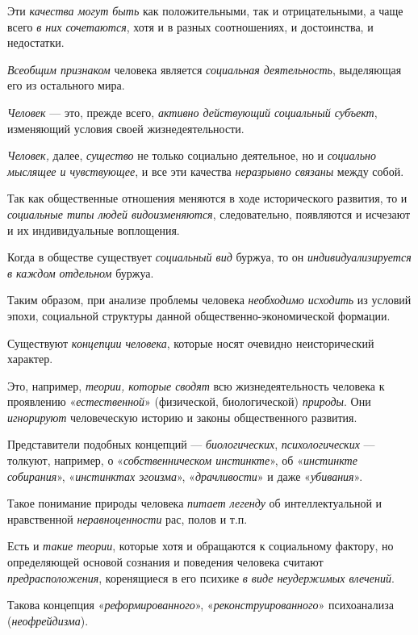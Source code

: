\documentclass[a4paper,14pt,russian]{extreport}
\begin{document}
Эти \emph{качества могут быть} как положительными, так и отрицательными, а чаще всего \emph{в них сочетаются}, хотя и в разных соотношениях, и достоинства, и недостатки.

\emph{Всеобщим признаком} человека является \emph{социальная деятельность}, выделяющая его из остального мира.

\emph{Человек} --- это, прежде всего, \emph{активно действующий социальный субъект}, изменяющий условия своей жизнедеятельности.

\emph{Человек,} далее, \emph{существо} не только социально деятельное, но и \emph{социально мыслящее и чувствующее}, и все эти качества \emph{неразрывно связаны} между собой.

Так как общественные отношения меняются в ходе исторического развития, то и \emph{социальные типы людей видоизменяются}, следовательно, появляются и исчезают и их индивидуальные воплощения.

Когда в обществе существует \emph{социальный вид} буржуа, то он \emph{индивидуализируется в каждом} \emph{отдельном} буржуа.

Таким образом, при анализе проблемы человека \emph{необходимо исходить} из условий эпохи, социальной структуры данной общественно-экономической формации.

Существуют \emph{концепции человека}, которые носят очевидно неисторический характер.

Это, например, \emph{теории, которые сводят} всю жизнедеятельность человека к проявлению «\emph{естественной}» (физической, биологической) \emph{природы}. Они \emph{игнорируют} человеческую историю и законы общественного развития.

Представители подобных концепций --- \emph{биологических}, \emph{психологических} --- толкуют, например, о «\emph{собственническом инстинкте}», об «\emph{инстинкте собирания}», «\emph{инстинктах эгоизма}», «\emph{драчливости}» и даже «\emph{убивания}».

Такое понимание природы человека \emph{питает легенду} об интеллектуальной и нравственной \emph{неравноценности} рас, полов и т.п.

Есть и \emph{такие теории}, которые хотя и обращаются к социальному фактору, но определяющей основой сознания и поведения человека считают \emph{предрасположения}, коренящиеся в его психике \emph{в виде неудержимых влечений}.

Такова концепция «\emph{реформированного}», «\emph{реконструированного}» психоанализа (\emph{неофрейдизма}).
\end{document}
